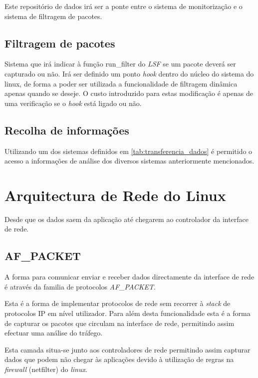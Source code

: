 Este repositório de dados irá ser a ponte entre o sistema de  monitorização e o
sistema de filtragem de pacotes. 

\subsection{Filtragem de pacotes}

Sistema que irá indicar à função run\_filter do \textit{LSF} se um pacote deverá
ser capturado ou não. Irá ser definido um ponto \textit{hook} dentro do núcleo
do sistema do linux, de forma a poder ser utilizada a funcionalidade de
filtragem dinâmica apenas quando se deseje. O custo introduzido para estas
modificação é apenas de uma verificação se o \textit{hook} está ligado ou não.


\subsection{Recolha de informações}

Utilizando um dos sistemas definidos em \ref{tab:transferencia_dados} é
permitido o acesso a informações de análise dos diversos sistemas anteriormente
mencionados.


\section{Arquitectura de Rede do Linux}

Desde que os dados saem da aplicação até chegarem ao controlador da interface
de rede. 

\subsection{AF\_PACKET}

A forma para comunicar enviar e receber dados directamente da interface de rede
é através da familia de protocolos \textit{AF\_PACKET}. 

Esta é a forma de implementar protocolos de rede sem recorrer à \textit{stack}
de protocolos IP em nível utilizador. Para além desta funcionalidade esta é a
forma de capturar os pacotes que circulam na interface de rede, permitindo
assim efectuar uma análise do tráfego.

Esta camada situa-se junto aos controladores de rede permitindo assim capturar
dados que podem não chegar às aplicações devido à utilização de regras na
\textit{firewall} (netfilter) do \textit{linux}.

